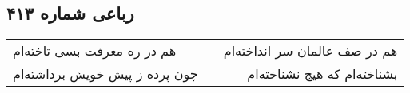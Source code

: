 \begin{center}
\section*{رباعی شماره ۴۱۳}
\label{sec:sh413}
\begin{longtable}{l p{0.5cm} r}
هم در ره معرفت بسی تاخته‌ام
&&
هم در صف عالمان سر انداخته‌ام
\\
چون پرده ز پیش خویش برداشته‌ام
&&
بشناخته‌ام که هیچ نشناخته‌ام
\\
\end{longtable}
\end{center}
